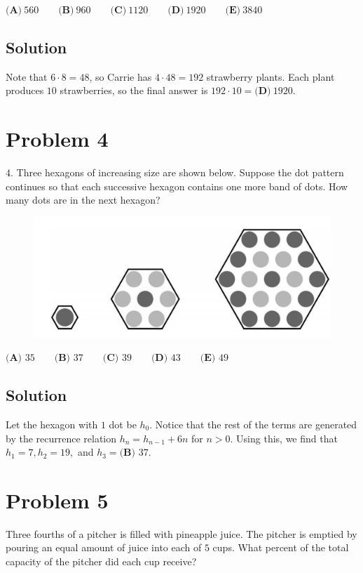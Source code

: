 \documentclass{article}
\begin{document}
$\textbf{(A)}\ 560 \qquad \textbf{(B)}\ 960 \qquad \textbf{(C)}\ 1120 \qquad \textbf{(D)}\ 1920 \qquad \textbf{(E)}\ 3840$
\subsection{Solution}
Note that $6\cdot 8 = 48$, so Carrie has $4\cdot 48 = 192$ strawberry plants. Each plant produces $10$ strawberries, so the final answer is $192\cdot 10 = \textbf{(D)}\ 1920$.

\section{Problem 4}
$4.$ Three hexagons of increasing size are shown below. Suppose the dot pattern continues so that each successive hexagon contains one more band of dots. How many dots are in the next hexagon?




\begin{figure}[ht]
\centering
\includegraphics[width=.5\textwidth]{2020 AMC 8 Problem 4.png}

\end{figure}







$\textbf{(A) }35 \qquad \textbf{(B) }37 \qquad \textbf{(C) }39 \qquad \textbf{(D) }43 \qquad \textbf{(E) }49$
\subsection{Solution}
Let the hexagon with $1$ dot be $h_0$. Notice that the rest of the terms are generated by the recurrence relation $h_n=h_{n-1}+6n$ for $n> 0$. Using this, we find that $h_1=7,h_2=19,$ and $h_3=\textbf{(B) }37$.

\section{Problem 5}
Three fourths of a pitcher is filled with pineapple juice. The pitcher is emptied by pouring an equal amount of juice into each of $5$ cups. What percent of the total capacity of the pitcher did each cup receive?
\end{document}
